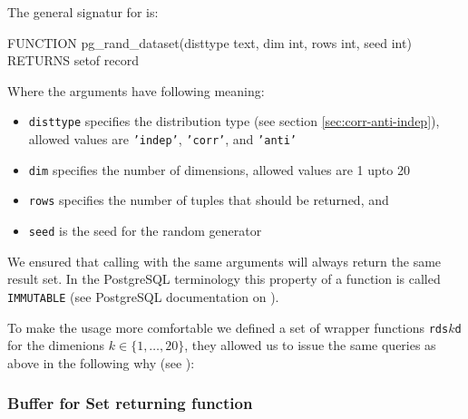 The general signatur for  is:
\begin{sqlscript}
FUNCTION pg_rand_dataset(disttype text, dim int, rows int, seed int)
RETURNS setof record
\end{sqlscript}

Where the arguments have following meaning:
\begin{itemize}
\item \texttt{disttype} specifies the distribution type (see section \ref{sec:corr-anti-indep}), allowed values are \texttt{'indep'}, \texttt{'corr'}, and \texttt{'anti'}

\item \texttt{dim} specifies the number of dimensions, allowed values are 1 upto 20 

\item \texttt{rows} specifies the number of tuples that should be returned, and 

\item \texttt{seed} is the seed for the random generator
\end{itemize}

We ensured that calling  with the same
arguments will always return the same result set. In the PostgreSQL
terminology this property of a function is called \texttt{IMMUTABLE}
(see PostgreSQL documentation on
).

To make the usage more comfortable we defined a set of wrapper
functions \texttt{rds$k$d} for the dimenions $k \in \{1, \ldots,
20\}$, they allowed us to issue the same queries as above in the
following why (see ):

\begin{sqlscript}


\end{sqlscript}


\subsubsection{Buffer for Set returning function}


